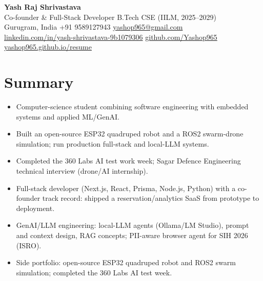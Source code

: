 \documentclass[10pt]{article}
\newif\ifmllead \mlleadfalse
\newif\ifresearch \researchfalse
\begin{document}
\begin{center}
{\LARGE\textbf{Yash Raj Shrivastava}}\\[2pt]
{\normalsize \ifresearch AI \& Agent Engineer \textbar{} B.Tech CSE (IILM, 2025--2029)\else Co-founder \& Full-Stack Developer \textbar{} B.Tech CSE (IILM, 2025--2029)\fi}\\[1pt]
{\small Gurugram, India \textbar{} +91 9589127943 \textbar{} \href{mailto:yashop965@gmail.com}{yashop965@gmail.com}\\
\href{https://www.linkedin.com/in/yash-shrivastava-9b1079306/}{linkedin.com/in/yash-shrivastava-9b1079306} \textbar{} \href{https://github.com/Yashop965}{github.com/Yashop965} \textbar{} \href{https://yashop965.github.io/resume/}{yashop965.github.io/resume}}
\end{center}
\vspace{2pt}

\section{Summary}
\ifresearch
\begin{itemize}
  \item Computer-science undergraduate working on LLM agents, agent evaluation, and RAG: led the benchmarking and E2E testing track of a PII-aware browser agent for ISRO SIH 2026, including live agent-trajectory diagnosis.
  \item Runs local-LLM agent stacks (Ollama/LM Studio) daily; certified in Anthropic rich-context AI apps (DeepLearning.AI); co-inventor of a published Indian patent application (App.\ No. 202611041006 A).
  \item Shipped full-stack products end-to-end (Next.js/Prisma/Node/Flutter); open-source ESP32 quadruped and ROS2 swarm simulation portfolio.
\end{itemize}
\else\ifmllead
\begin{itemize}
  \item Computer-science student combining software engineering with embedded systems and applied ML/GenAI.
  \item Built an open-source ESP32 quadruped robot and a ROS2 swarm-drone simulation; run production full-stack and local-LLM systems.
  \item Completed the 360 Labs AI test work week; Sagar Defence Engineering technical interview (drone/AI internship).
\end{itemize}
\else
\begin{itemize}
  \item Full-stack developer (Next.js, React, Prisma, Node.js, Python) with a co-founder track record: shipped a reservation/analytics SaaS from prototype to deployment.
  \item GenAI/LLM engineering: local-LLM agents (Ollama/LM Studio), prompt and context design, RAG concepts; PII-aware browser agent for SIH 2026 (ISRO).
  \item Side portfolio: open-source ESP32 quadruped robot and ROS2 swarm simulation; completed the 360 Labs AI test week.
\end{itemize}
\fi\fi
\end{document}
